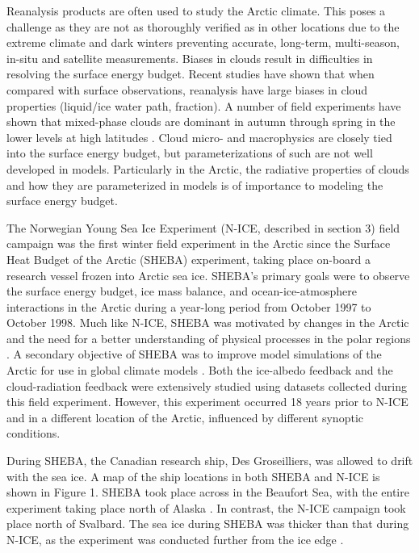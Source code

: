 Reanalysis products are often used to study the Arctic climate. This poses a challenge as they are not as thoroughly verified as in other locations due to the extreme climate and dark winters preventing accurate, long-term, multi-season, in-situ and satellite measurements. Biases in clouds result in difficulties in resolving the surface energy budget. Recent studies have shown that when compared with surface observations, reanalysis have large biases in cloud properties (liquid/ice water path, fraction). A number of field experiments have shown that mixed-phase clouds are dominant in autumn through spring in the lower levels at high latitudes \cite{Intrieri:2002cn} \cite{Wang:2005vx}. Cloud micro- and macrophysics are closely tied into the surface energy budget, but parameterizations of such are not well developed in models. Particularly in the Arctic, the radiative properties of clouds and how they are parameterized in models is of importance to modeling the surface energy budget. 

The  Norwegian Young Sea Ice Experiment (N-ICE, described in section 3) field campaign was the first winter field experiment in the Arctic since the Surface Heat Budget of the Arctic (SHEBA) experiment, taking place on-board a research vessel frozen into Arctic sea ice. SHEBA’s primary goals were to observe the surface energy budget, ice mass balance, and ocean-ice-atmosphere interactions in the Arctic during a year-long period from October 1997 to October 1998. Much like N-ICE, SHEBA was motivated by changes in the Arctic and the need for a better understanding of physical processes in the polar regions \cite{Randall:1998up}. A secondary objective of SHEBA was to improve model simulations of the Arctic for use in global climate models \cite{Uttal:2002vw}. Both the ice-albedo feedback and the cloud-radiation feedback were extensively studied using datasets collected during this field experiment. However, this experiment occurred 18 years prior to N-ICE and in a different location of the Arctic, influenced by different synoptic conditions. 

During SHEBA, the Canadian research ship, Des Groseilliers, was allowed to drift with the sea ice. A map of the ship locations in both SHEBA and N-ICE is shown in Figure 1. SHEBA took place across in the Beaufort Sea, with the entire experiment taking place north of Alaska \cite{Uttal:2002vw}. In contrast, the N-ICE campaign took place north of Svalbard. The sea ice during SHEBA was thicker than that during N-ICE, as the experiment was conducted further from the ice edge \cite{Graham:2017cs}. 

